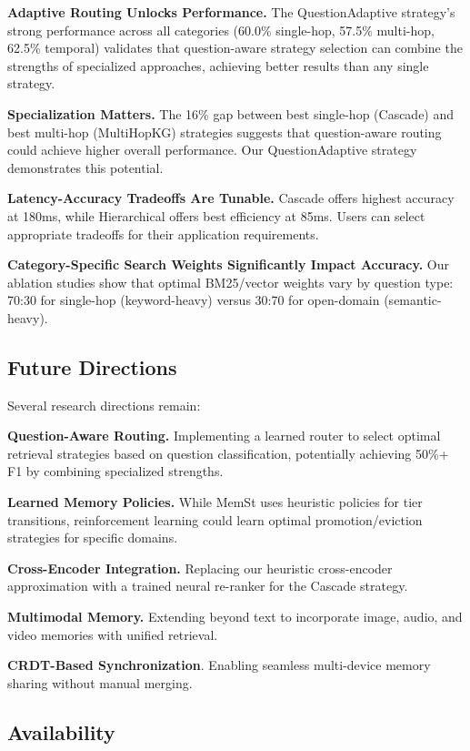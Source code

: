 \textbf{Adaptive Routing Unlocks Performance.} The QuestionAdaptive strategy's strong performance across all categories (60.0\% single-hop, 57.5\% multi-hop, 62.5\% temporal) validates that question-aware strategy selection can combine the strengths of specialized approaches, achieving better results than any single strategy.

\textbf{Specialization Matters.} The 16\% gap between best single-hop (Cascade) and best multi-hop (MultiHopKG) strategies suggests that question-aware routing could achieve higher overall performance. Our QuestionAdaptive strategy demonstrates this potential.

\textbf{Latency-Accuracy Tradeoffs Are Tunable.} Cascade offers highest accuracy at 180ms, while Hierarchical offers best efficiency at 85ms. Users can select appropriate tradeoffs for their application requirements.

\textbf{Category-Specific Search Weights Significantly Impact Accuracy.} Our ablation studies show that optimal BM25/vector weights vary by question type: 70:30 for single-hop (keyword-heavy) versus 30:70 for open-domain (semantic-heavy).

\subsection{Future Directions}

Several research directions remain:

\textbf{Question-Aware Routing.} Implementing a learned router to select optimal retrieval strategies based on question classification, potentially achieving 50\%+ F1 by combining specialized strengths.

\textbf{Learned Memory Policies.} While MemSt uses heuristic policies for tier transitions, reinforcement learning could learn optimal promotion/eviction strategies for specific domains.

\textbf{Cross-Encoder Integration.} Replacing our heuristic cross-encoder approximation with a trained neural re-ranker for the Cascade strategy.

\textbf{Multimodal Memory.} Extending beyond text to incorporate image, audio, and video memories with unified retrieval.

\textbf{CRDT-Based Synchronization}. Enabling seamless multi-device memory sharing without manual merging.

\subsection{Availability}

